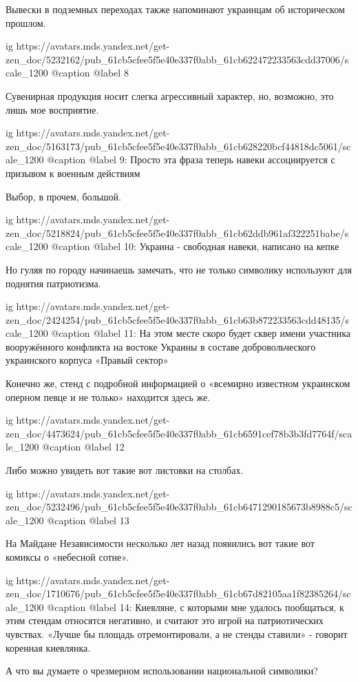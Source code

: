\begin{multicols}{3}
Вывески в подземных переходах также напоминают украинцам об историческом прошлом.

\ifcmt
  ig https://avatars.mds.yandex.net/get-zen_doc/5232162/pub_61cb5cfee5f5e40e337f0abb_61cb622472233563cdd37006/scale_1200
  @caption @label 8
\fi

Сувенирная продукция носит слегка агрессивный характер, но, возможно, это лишь мое восприятие.

\ifcmt
  ig https://avatars.mds.yandex.net/get-zen_doc/5163173/pub_61cb5cfee5f5e40e337f0abb_61cb628220bcf44818dc5061/scale_1200
  @caption @label 9: Просто эта фраза теперь навеки ассоциируется с призывом к военным действиям
\fi

Выбор, в прочем, большой.

\ifcmt
  ig https://avatars.mds.yandex.net/get-zen_doc/5218824/pub_61cb5cfee5f5e40e337f0abb_61cb62ddb961af322251babe/scale_1200
  @caption @label 10: Украина - свободная навеки, написано на кепке 
\fi

Но гуляя по городу начинаешь замечать, что не только символику используют для
поднятия патриотизма.

\ifcmt
  ig https://avatars.mds.yandex.net/get-zen_doc/2424254/pub_61cb5cfee5f5e40e337f0abb_61cb63b872233563cdd48135/scale_1200
  @caption @label 11: На этом месте скоро будет сквер имени участника вооружённого конфликта на востоке Украины в составе добровольческого украинского корпуса «Правый сектор»
\fi

Конечно же, стенд с подробной информацией о «всемирно известном украинском
оперном певце и не только» находится здесь же.

\ifcmt
  ig https://avatars.mds.yandex.net/get-zen_doc/4473624/pub_61cb5cfee5f5e40e337f0abb_61cb6591cef78b3b3fd7764f/scale_1200
  @caption @label 12
\fi

Либо можно увидеть вот такие вот листовки на столбах.

\ifcmt
  ig https://avatars.mds.yandex.net/get-zen_doc/5232496/pub_61cb5cfee5f5e40e337f0abb_61cb6471290185673b8988c5/scale_1200
  @caption @label 13
\fi

На Майдане Независимости несколько лет назад появились вот такие вот комиксы о «небесной сотне».

\ifcmt
  ig https://avatars.mds.yandex.net/get-zen_doc/1710676/pub_61cb5cfee5f5e40e337f0abb_61cb67d82105aa1f82385264/scale_1200
  @caption @label 14: Киевляне, с которыми мне удалось пообщаться, к этим стендам относятся негативно, и считают это игрой на патриотических чувствах. «Лучше бы площадь отремонтировали, а не стенды ставили» - говорит коренная киевлянка.
\fi

А что вы думаете о чрезмерном использовании национальной символики?

\end{multicols} %
